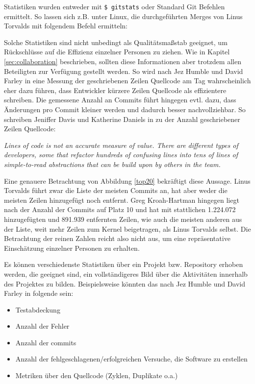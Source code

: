 Statistiken wurden entweder mit \texttt{\$ gitstats} \cite{link:gitstats} oder
Standard Git Befehlen ermittelt. So lassen sich z.B. unter Linux, die
durchgeführten Merges von Linus Torvalds mit folgendem Befehl ermitteln:



Solche Statistiken sind nicht unbedingt als Qualitätsmaßstab geeignet, um
Rückschlüsse auf die Effizienz einzelner Personen zu ziehen. Wie in Kapitel
\ref{sec:collaboration} beschrieben, sollten diese Informationen aber trotzdem
allen Beteiligten zur Verfügung gestellt werden.  So wird nach Jez Humble und
David Farley in \cite[S.~138]{cd} eine Messung der geschriebenen Zeilen
Quellcode am Tag wahrscheinlich eher dazu führen, dass Entwickler kürzere Zeilen
Quellcode als effizientere schreiben. Die gemessene Anzahl an Commits führt hingegen
evtl. dazu, dass Änderungen pro Commit kleiner werden und dadurch besser
nachvollziehbar. So schreiben Jeniffer Davis und Katherine Daniels in
\cite[S.~179]{effdo} zu der Anzahl geschriebener Zeilen Quellcode:
\begin{center}
\textit{\glqq{}Lines of code is not an accurate measure of value. There are
different types of developers, some that refactor hundreds of confusing lines
into tens of lines of simple-to-read abstractions that can be build upon by
others in the team.\grqq{}}
\end{center}

Eine genauere Betrachtung von Abbildung \ref{top20} bekräftigt diese Aussage.
Linus Torvalds führt zwar die Liste der meisten Commits an, hat aber weder die
meisten Zeilen hinzugefügt noch entfernt. Greg Kroah-Hartman hingegen liegt
nach der Anzahl der Commits auf Platz 10 und hat mit stattlichen 1.224.072
hinzugefügten und 891.939 entfernten Zeilen, wie auch die meisten anderen aus
der Liste, weit mehr Zeilen zum Kernel beigetragen, als Linus Torvalds selbst.
Die Betrachtung der reinen Zahlen reicht also nicht aus, um eine repräsentative
Einschätzung einzelner Personen zu erhalten.

Es können verschiedenste Statistiken über ein Projekt bzw. Repository erhoben
werden, die geeignet sind, ein vollständigeres Bild über die Aktivitäten
innerhalb des Projektes zu bilden. Beispielsweise könnten das nach Jez Humble
und David Farley in \cite[S.~138]{cd} folgende sein:

\begin{itemize}
\item Testabdeckung
\item Anzahl der Fehler
\item Anzahl der \glspl{commit}
\item Anzahl der fehlgeschlagenen/erfolgreichen Versuche, die Software zu erstellen
\item Metriken über den Quellcode (Zyklen, Duplikate o.a.)
\end{itemize}

